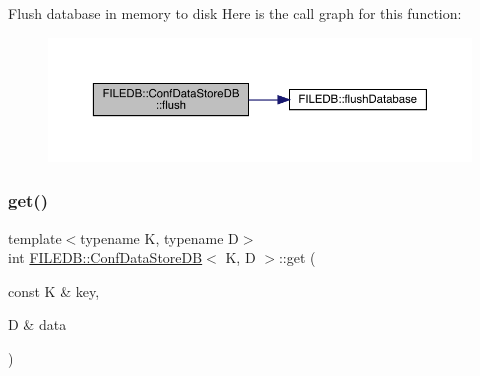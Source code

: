 Flush database in memory to disk Here is the call graph for this function\+:
\nopagebreak
\begin{figure}[H]
\begin{center}
\leavevmode
\includegraphics[width=350pt]{d8/d19/classFILEDB_1_1ConfDataStoreDB_a982ae3b2108acbf75ab15a939fc7871b_cgraph}
\end{center}
\end{figure}
\mbox{\label{classFILEDB_1_1ConfDataStoreDB_ad89d0c1aef7c82fb0273d50bfea7cf0a}} 
\subsubsection{\texorpdfstring{get()}{get()}\hspace{0.1cm}{\footnotesize\ttfamily [1/2]}}
{\footnotesize\ttfamily template$<$typename K, typename D$>$ \\
int \mbox{\hyperlink{classFILEDB_1_1ConfDataStoreDB}{F\+I\+L\+E\+D\+B\+::\+Conf\+Data\+Store\+DB}}$<$ K, D $>$\+::get (\begin{DoxyParamCaption}\item[{const K \&}]{key,  }\item[{D \&}]{data }\end{DoxyParamCaption})\hspace{0.3cm}{\ttfamily [inline]}}

